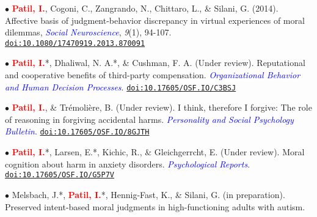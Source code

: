 \documentclass[10pt]{article}
\begin{document}
	$\bullet$ \textbf{\textcolor{red}{Patil, I.}}, Cogoni, C., Zangrando, N., Chittaro, L., \& Silani, G. (2014). {Affective basis of judgment-behavior \hspace*{0.1in}discrepancy in virtual experiences of moral dilemmas}, \textit{\textcolor{blue}{Social Neuroscience}}, \textit{9}(1), 94-107. \\
	\hspace*{0.1in}\href{https://drive.google.com/file/d/0B6_u70YpdJKnV3RIR2s2cWlFdVU/view?usp=sharing}{\tt doi:10.1080/17470919.2013.870091}
	\miniskip


	$\bullet$ \textbf{\textcolor{red}{Patil, I.}}*, Dhaliwal, N. A.*, \& Cushman, F. A. (Under review). Reputational and cooperative benefits of \hspace*{0.1in}third-party compensation. \textit{\textcolor{blue}{Organizational Behavior and Human Decision Processes}}. \hspace*{0.1in}\href{https://psyarxiv.com/c3bsj/}{\tt doi:10.17605/OSF.IO/C3BSJ}
	\miniskip
	
	$\bullet$ \textbf{\textcolor{red}{Patil, I.}}, \& Tr\'{e}moli\`{e}re, B. (Under review). I think, therefore I forgive: The role of reasoning in forgiving \hspace*{0.1in}accidental harms. \textit{\textcolor{blue}{Personality and Social Psychology Bulletin}}. \href{https://psyarxiv.com/8gjth/}{\tt doi:10.17605/OSF.IO/8GJTH}
	\miniskip
	
	$\bullet$ \textbf{\textcolor{red}{Patil, I.}}*, Larsen, E.*, Kichic, R., \& Gleichgerrcht, E. (Under review). Moral cognition about harm in \hspace*{0.1in}anxiety disorders. \textit{\textcolor{blue}{Psychological Reports}}. \href{https://psyarxiv.com/g5p7v/}{\tt doi:10.17605/OSF.IO/G5P7V}
	\miniskip

	$\bullet$ Melsbach, J.*, \textbf{\textcolor{red}{Patil, I.}}*, Hennig-Fast, K., \& Silani, G. (in preparation). Preserved intent-based moral \hspace*{0.1in}judgments in high-functioning adults with autism.
	
\end{document}
